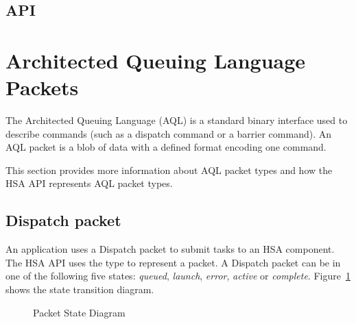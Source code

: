 \documentclass[final]{book}
\begin{document}
\subsection{API}


\section{Architected Queuing Language Packets}\label{sec:aql}
The Architected Queuing Language (AQL) is a standard binary interface used to
describe commands (such as a dispatch command or a barrier command). An AQL 
packet is a blob of data with a defined format encoding one command.

This section provides more information about AQL packet types and how the HSA 
API represents AQL packet types.

\subsection{Dispatch packet}\label{dispatch-packet}

An application uses a Dispatch packet to submit tasks to an HSA component. The 
HSA API uses the  type to represent a packet. 
A Dispatch packet can be in one of the following five states: \emph{queued},
\emph{launch}, \emph{error}, \emph{active} or
\emph{complete}. Figure~\ref{fig:packetstate} shows the state transition
diagram.

\begin{figure}[b]
  \centering
  \scriptsize
{}
  \centering
  \caption{Packet State Diagram}
  \label{fig:packetstate}
\end{figure}
\end{document}
